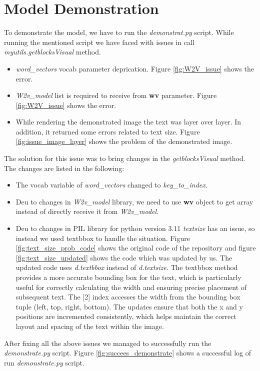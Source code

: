 \section{Model Demonstration}
To demonstrate the model, we have to run the \textit{demonstrat.py} script. While running the mentioned script we have faced with issues in call \textit{myutils.getblocksVisual} method.
\begin{itemize}
    \item \textit{word\_vectors} vocab parameter deprication. Figure \ref{fig:W2V_issue} shows the error.
    \item \textit{W2v\_model} list is required to receive from \textbf{wv} parameter. Figure \ref{fig:W2V_issue} shows the error.
    \item While rendering the demonstrated image the text was layer over layer. In addition, it returned some errors related to text size. 
 Figure \ref{fig:issue_image_layer} shows the problem of the demonstrated image.
\end{itemize} 
The solution for this issue was to bring changes in the \textit{getblocksVisual} method. 
The changes are listed in the following:
 \begin{itemize}
    \item The vocab variable of \textit{word\_vectors} changed to \textit{key\_to\_index}.
    \item Deu to changes in \textit{W2v\_model} library, we need to use \textbf{wv} object to get array instead of directly receive it from \textit{W2v\_model}.
    \item Deu to changes in PIL library for python version 3.11 \textit{textsize} has an issue, so instead we used textbbox to handle the situation.
 Figure \ref{fig:text_size_prob_code} shows the original code of the repository and figure \ref{fig:text_size_updated} shows the code which was updated by us.
 The updated code uses \textit{d.textbbox} instead of \textit{d.textsize}. 
 The textbbox method provides a more accurate bounding box for the text, which is particularly useful for correctly calculating the width and ensuring precise placement of subsequent text. 
 The [2] index accesses the width from the bounding box tuple (left, top, right, bottom).
 The updates ensure that both the x and y positions are incremented consistently, which helps maintain the correct layout and spacing of the text within the image.
 \end{itemize}

 After fixing all the above issues we managed to successfully run the \textit{demonstrate.py} script. 
 Figure \ref{fig:succees_demonstrate} shows a successful log of run \textit{demonstrate.py} script.

